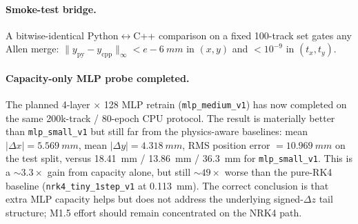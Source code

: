 \documentclass[a4paper,11pt]{article}
\newcommand{\SI}[2]{#1~#2}
\newcommand{\dz}{\Delta z}
\begin{document}
\paragraph{Smoke-test bridge.}  A bitwise-identical
Python$\leftrightarrow$C++ comparison on a fixed 100-track set
gates any Allen merge:
$\|y_\mathrm{py}-y_\mathrm{cpp}\|_\infty < \SI{e-6}{mm}$ in
$(x,y)$ and $<10^{-9}$ in $(t_x,t_y)$.

\paragraph{Capacity-only MLP probe completed.}  The planned
4-layer $\times$ 128 MLP retrain (\texttt{mlp\_medium\_v1}) has now
completed on the same 200k-track / 80-epoch CPU protocol.  The
result is materially better than \texttt{mlp\_small\_v1} but still
far from the physics-aware baselines: mean
$|\Delta x|=\SI{5.569}{mm}$, mean $|\Delta y|=\SI{4.318}{mm}$,
RMS position error $=\SI{10.969}{mm}$ on the test split, versus
\SI{18.41}{mm} / \SI{13.86}{mm} / \SI{36.3}{mm} for
\texttt{mlp\_small\_v1}.  This is a $\sim 3.3\times$ gain from
capacity alone, but still $\sim 49\times$ worse than the pure-RK4
baseline (\texttt{nrk4\_tiny\_1step\_v1} at \SI{0.113}{mm}).  The
correct conclusion is that extra MLP capacity helps but does not
address the underlying signed-$\dz$ tail structure; M1.5 effort
should remain concentrated on the NRK4 path.
\end{document}
